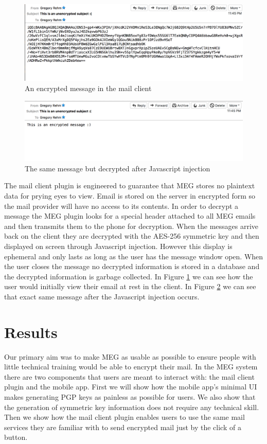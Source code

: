 \documentclass[11pt]{article}
\begin{document}
\begin{figure}[h]
    \centering
    \includegraphics[scale=.5]{encrypted-msg.png}
    \caption{An encrypted message in the mail client}
    \label{fig:Encrypted-client}
\end{figure}
\begin{figure}[h]
    \centering
    \includegraphics[scale=.5]{decrypted-msg.png}
    \caption{The same message but decrypted after Javascript injection}
    \label{fig:Decrypted-client}
\end{figure}

\par The mail client plugin is engineered to guarantee that MEG stores no plaintext data for prying eyes to view. Email is stored on the server in encrypted form so the mail provider will have no access to its contents. In order to decrypt a message the MEG plugin looks for a special header attached to all MEG emails and then transmits them to the phone for decryption. When the messages arrive back on the client they are decrypted with the AES-256 symmetric key and then displayed on screen through Javascript injection. However this display is ephemeral and only lasts as long as the user has the message window open. When the user closes the message no decrypted information is stored in a database and the decrypted information is garbage collected. In Figure \ref{fig:Encrypted-client} we can see how the user would initially view their email at rest in the client. In Figure \ref{fig:Decrypted-client} we can see that exact same message after the Javascript injection occurs.
\section{Results}
Our primary aim was to make MEG as usable as possible to ensure people with little technical training would be able to encrypt their mail. In the MEG system there are two components that users are meant to interact with: the mail client plugin and the mobile app. First we will show how the mobile app's minimal UI makes generating PGP keys as painless as possible for users. We also show that the generation of symmetric key information does not require any technical skill. Then we show how the mail client plugin enables users to use the same mail services they are familiar with to send encrypted mail just by the click of a button.
\end{document}

